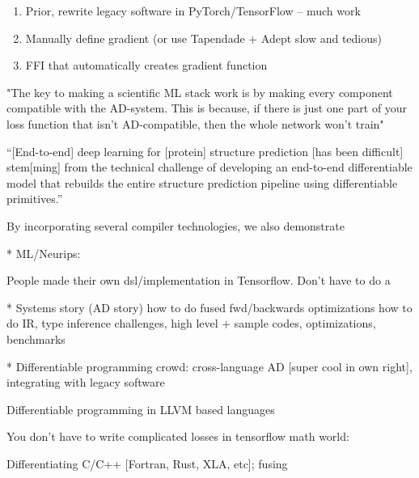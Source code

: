 \begin{enumerate}
    \item Prior, rewrite legacy software in PyTorch/TensorFlow -- much work
    \item Manually define gradient (or use Tapendade + Adept slow and tedious)
    \item FFI that automatically creates gradient function
\end{enumerate}







"The key to making a scientific ML stack work is by making every component compatible with the AD-system. This is because, if there is just one part of your loss function that isn't AD-compatible, then the whole network won't train" \cite{10.15200/winn.156631.13064}



``[End-to-end] deep learning for [protein] structure prediction [has been difficult] stem[ming] from the technical challenge of developing an end-to-end differentiable model that rebuilds the entire structure prediction pipeline using differentiable primitives.'' \cite{alquraishi2019end}



By incorporating several compiler technologies, we also demonstrate 





* ML/Neurips:

People made their own dsl/implementation in Tensorflow. Don't have to do a 

* Systems story (AD story) how to do fused fwd/backwards optimizations how to do IR, type inference challenges, high level
 + sample codes, optimizations, benchmarks

* Differentiable programming crowd: cross-language AD [super cool in own right], integrating with legacy software

Differentiable programming in LLVM based languages



You don't have to write complicated losses in tensorflow math world:


Differentiating C/C++ [Fortran, Rust, XLA, etc]; 
fusing
